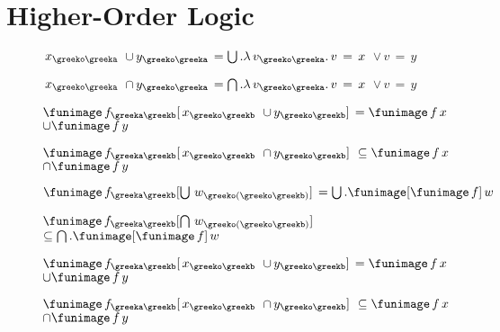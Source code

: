 \section{Higher-Order Logic}

\begin{description} 

\item[\parbox{\textwidth}{X5200\index{X5200@X5200, {\bf Theorem}} }] \texttt{$ \,x_{\greeko\greeka} $ $\cup \,y_{\greeko\greeka} \,= \bigcup . \lambda \,v_{\greeko\greeka} . \,v \,= \,x $ $\lor \,v \,= \,y$}


\item[\parbox{\textwidth}{X5201\index{X5201@X5201, {\bf Theorem}} }] \texttt{$ \,x_{\greeko\greeka} $ $\cap \,y_{\greeko\greeka} \,= \bigcap . \lambda \,v_{\greeko\greeka} . \,v \,= \,x $ $\lor \,v \,= \,y$}


\item[\parbox{\textwidth}{X5202\index{X5202@X5202, {\bf Theorem}} }] \texttt{$ \funimage \,f_{\greeka\greekb} [ \,x_{\greeko\greekb} $ $\cup \,y_{\greeko\greekb} ] \,= \funimage \,f \,x $ $\cup \funimage \,f \,y$}


\item[\parbox{\textwidth}{X5203\index{X5203@X5203, {\bf Theorem}} }] \texttt{$ \funimage \,f_{\greeka\greekb} [ \,x_{\greeko\greekb} $ $\cap \,y_{\greeko\greekb} ] $ $\subseteq \funimage \,f \,x $ $\cap \funimage \,f \,y$}


\item[\parbox{\textwidth}{X5204\index{X5204@X5204, {\bf Theorem}} }] \texttt{$ \funimage \,f_{\greeka\greekb} [ \bigcup \,w_{\greeko(\greeko\greekb)} ] \,= \bigcup . \funimage [ \funimage \,f ] \,w$}


\item[\parbox{\textwidth}{X5205\index{X5205@X5205, {\bf Theorem}} }] \texttt{$ \funimage \,f_{\greeka\greekb} [ \bigcap \,w_{\greeko(\greeko\greekb)} ] $ $\subseteq \bigcap . \funimage [ \funimage \,f ] \,w$}


\item[\parbox{\textwidth}{X5206\index{X5206@X5206, {\bf Theorem}} }] \texttt{$ \funimage \,f_{\greeka\greekb} [ \,x_{\greeko\greekb} $ $\cup \,y_{\greeko\greekb} ] \,= \funimage \,f \,x $ $\cup \funimage \,f \,y$}


\item[\parbox{\textwidth}{X5207\index{X5207@X5207, {\bf Theorem}} }] \texttt{$ \funimage \,f_{\greeka\greekb} [ \,x_{\greeko\greekb} $ $\cap \,y_{\greeko\greekb} ] $ $\subseteq \funimage \,f \,x $ $\cap \funimage \,f \,y$}



\end{description}
